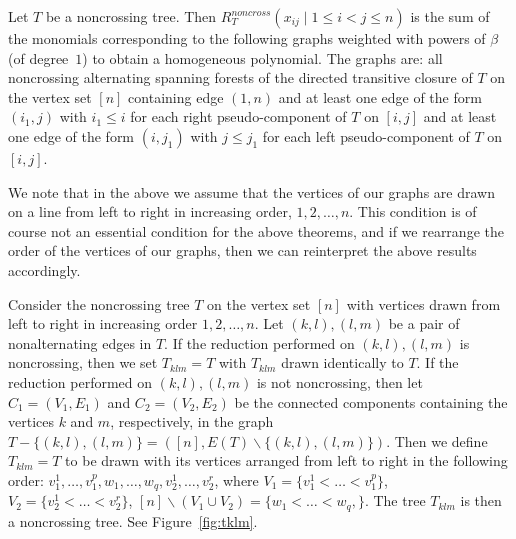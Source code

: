 \documentclass[ALCO,ThmDefs]{cedram}
\numberwithin{equation}{section}
\newcommand*\+{\smash{\lower2pt\hbox{\rlap{\vrule height14pt}}\raise2pt\hbox{\rlap{\hskip-3pt \vrule height.4pt depth0pt width14.7pt}}}}
\begin{document}
\begin{theo}\label{gen:non}
Let $T$ be a noncrossing tree. Then $R^{noncross}_T(x_{ij} \mid 1\leq i<j\leq n)$ is the sum of the monomials corresponding to the following graphs weighted with powers of $\beta$ (of degree~$1$) to obtain a homogeneous polynomial. The graphs are: all
noncrossing alternating spanning forests of the directed transitive closure of $T$ on the vertex set $[n]$ containing edge $(1, n)$ and at least one edge of the form $(i_1, j)$ with $i_1\leq i$ for each right pseudo-component of $T$ on $[i, j]$ and at least one edge of the form $(i, j_1)$ with $j\leq j_1$ for each left pseudo-component of $T$ on $[i, j]$. 
\end{theo}

We note that in the above we assume that the vertices of our graphs are drawn on a line from left to right in increasing order, $1, 2, \dots, n.$ This condition is of course not an essential condition for the above theorems, and if we rearrange the order of the vertices of our graphs, then we can reinterpret the above results accordingly.

Consider the noncrossing tree $T$ on the vertex set $[n]$ with vertices drawn from left to right in increasing order $1, 2,\dots, n$. Let $(k,l), (l,m)$ be a pair of nonalternating edges in $T$. If the reduction performed on $(k,l), (l,m)$ is noncrossing, then we set $T_{klm}=T$ with $T_{klm}$ drawn identically to $T$. If the reduction performed on $(k,l), (l,m)$ is not noncrossing, then let $C_1=(V_1, E_1)$ and $C_2=(V_2, E_2)$ be the connected components containing the vertices $k$ and $m$, respectively, in the graph $T-\{(k,l), (l,m)\}=([n], E(T)\backslash \{(k,l), (l,m)\})$. Then we define $T_{klm}=T$ to be drawn with its vertices arranged from left to right in the following order: $v_1^1, \dots, v_1^p, w_1, \dots, w_q, v_2^1, \dots, v_2^r$, where $V_1=\{v_1^1< \dots< v_1^p\}$, $V_2=\{v_2^1< \dots< v_2^r\}$, $ [n]\backslash (V_1 \cup V_2)=\{w_1< \dots< w_q,\}.$ The tree $T_{klm}$ is then a noncrossing tree. See Figure~\ref{fig:tklm}.
\end{document}
